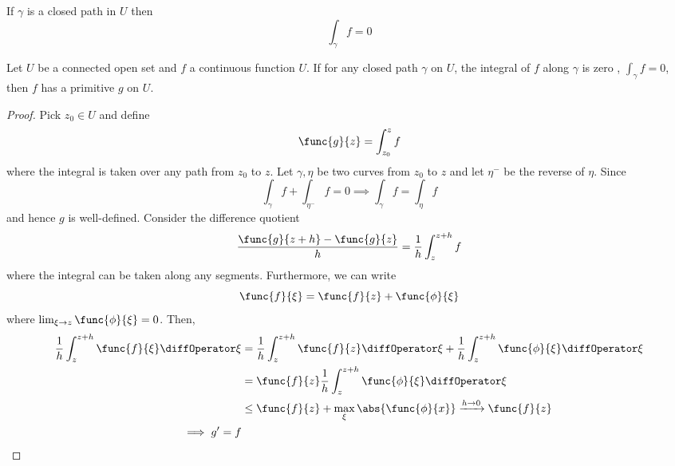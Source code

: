 \begin{corollary}
    If \(\gamma\) is a closed path in \(U\) then 
    \begin{equation*}
        \int_{\gamma} f = 0
    \end{equation*}
\end{corollary}

\begin{theorem}
    Let \(U\) be a connected open set and \(f\) a continuous function \(U\). If for any closed path \(\gamma\) on \(U\), the integral of \(f\) along \(\gamma\) is zero , \(\int_{\gamma} f = 0 \), then \(f\) has a primitive \(g\) on \(U\).
\end{theorem}

\begin{proof}
    Pick \(z_0 \in U\) and define 
    \begin{equation*}
        \func{g}{z} = \int_{z_0}^z  f
    \end{equation*}
    where the integral is taken over any path from \(z_0\) to \(z\). Let \(\gamma, \eta\) be two curves from \(z_0\) to \(z\) and let \(\eta^-\) be the reverse of \(\eta\). Since 
    \begin{equation*}
        \int_{\gamma} f + \int_{\eta^{-}} f =0 \implies \int_{\gamma} f = \int_{\eta} f 
    \end{equation*}
    and hence \(g\) is well-defined. Consider the difference quotient 
    \begin{equation*}
        \dfrac{\func{g}{z + h} - \func{g}{z}}{h} = \dfrac{1}{h} \int_z^{z+h} f
    \end{equation*}
    where the integral can be taken along any segments. Furthermore, we can write 
    \begin{equation*}
        \func{f}{\xi} = \func{f}{z} + \func{\phi}{\xi}
    \end{equation*}
    where \(\lim_{\xi \to z} \func{\phi}{\xi} = 0\). Then, 
    \begin{align*}
        \dfrac{1}{h} \int_z^{z+h} \func{f}{\xi} \diffOperator \xi &= \dfrac{1}{h} \int_z^{z+h} \func{f}{z} \diffOperator \xi + \dfrac{1}{h} \int_z^{z+h} \func{\phi}{\xi} \diffOperator \xi \\
        &= \func{f}{z} \dfrac{1}{h} \int_z^{z+h} \func{\phi}{\xi} \diffOperator \xi \\
        &\leq \func{f}{z} + \max_{\xi} \abs{\func{\phi}{x}} \xrightarrow{h \to 0} \func{f}{z}\\
        \implies g' =f 
    \end{align*}
\end{proof}

